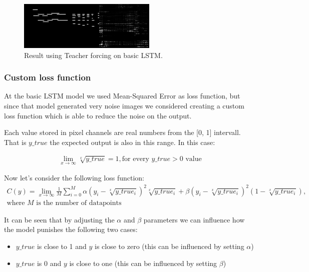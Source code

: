 \documentclass{article}
\begin{document}
\begin{figure}[!htb]
	\centering
	\includegraphics[width=\linewidth]{LSTMresult1.png}
	\caption{Result using Teacher forcing on basic LSTM.}
	\label{fig:LSTMresult-1}
\end{figure}

\subsubsection{Custom loss function}

At the basic LSTM model we used Mean-Squared Error as loss function, but since that model generated very noise images we considered creating a custom loss function which is able to reduce the noise on the output. 

Each value stored in pixel channels are real numbers from the [0, 1] intervall. That is $y\_true$ the expected output is also in this range. In this case: 

\begin{gather}
\lim_{x\to\infty} \sqrt[x]{y\_true} = 1, \text{for every $y\_true > 0$ value}
\end{gather}

Now let's consider the following loss function: 
\begin{gather}
	C(y) = \lim_{x\to\infty} \frac{1}{M}\sum_{i = 0}^{M} \alpha(y_i - \sqrt[x]{y\_true_i})^{2}\sqrt[x]{y\_true_i} + \beta(y_i - \sqrt[x]{y\_true_i})^{2}(1 - \sqrt[x]{y\_true_i}), \\
	\text{where $M$ is the number of datapoints}
\end{gather}

It can be seen that by adjusting the $\alpha$ and $\beta$ parameters we can influence how the model punishes the following two cases: 
\begin{itemize}
	\item $y\_true$ is close to 1 and $y$ is close to zero (this can be influenced by setting $\alpha$)
	\item $y\_true$ is 0 and $y$ is close to one (this can be influenced by setting $\beta$)
\end{itemize}
\end{document}
